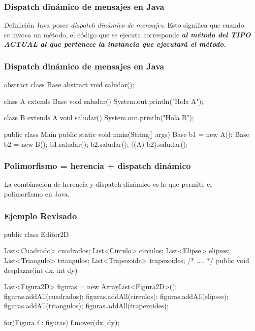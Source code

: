 \documentclass{beamer}
\begin{document}
\begin{frame}
  \frametitle{Dispatch dinámico de mensajes en Java}
  \begin{alertblock}{Definición}
    Java posee \emph{dispatch dinámico de mensajes}. Esto significa
    que cuando se invoca un método, el código que se ejecuta
    corresponde \textit{\textbf{al método del TIPO ACTUAL al que
        pertenece la instancia que ejecutará el método.}}
  \end{alertblock}
\end{frame}

\begin{frame}[fragile]
  \frametitle{Dispatch dinámico de mensajes en Java}

  \begin{jsmall}
    abstract class Base {
      abstract void saludar();
    }
    
    class A extends Base {
      void saludar() { System.out.println("Hola A"); }
    }

    class B extends A {
      void saludar() { System.out.println("Hola B"); }
    }

    public class Main {
      public static void main(String[] args) {
        Base b1 = new A(); Base b2 = new B();
        b1.saludar(); b2.saludar();
        ((A) b2).saludar();        
      }
    }   
  \end{jsmall}
  
\end{frame}

\begin{frame}
  \frametitle{Polimorfismo = herencia + dispatch dinámico}
  \begin{alertblock}{}
    La combinación de herencia y dispatch dinámico es la que permite
    el polimorfismo en Java.
  \end{alertblock}
\end{frame}

\begin{frame}[fragile]
  \frametitle{Ejemplo Revisado}

  \begin{jsmall}
    public class Editor2D {
      List<Cuadrado> cuadrados;
      List<Circulo> circulos;
      List<Elipse> elipses;
      List<Triangulo> triangulos;
      List<Trapezoide> trapezoides;
      /* .... */
      public void desplazar(int dx, int dy) {
        List<Figura2D> figuras = new ArrayList<Figura2D>();
        figuras.addAll(cuadrados);
        figuras.addAll(circulos);
        figuras.addAll(elipses);
        figuras.addAll(triangulos);
        figuras.addAll(trapezoides);

        for(Figura f : figuras) {
          f.mover(dx, dy);
        }
      }      
    }    
  \end{jsmall}  
\end{frame}
\end{document}
